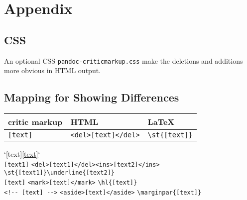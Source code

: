 \documentclass[]{article}
\begin{document}
\section{Appendix}\label{appendix}

\subsection{CSS}\label{css}

An optional CSS \texttt{pandoc-criticmarkup.css} make the deletions and
additions more obvious in HTML output.

\subsection{Mapping for Showing
Differences}\label{mapping-for-showing-differences}

\begin{longtable}[]{@{}lll@{}}
\toprule
critic markup & HTML & LaTeX\tabularnewline
\midrule
\endhead
\texttt{{[}text{]}} &
\texttt{\textless{}del\textgreater{}{[}text{]}\textless{}/del\textgreater{}}
& \texttt{\textbackslash{}st\{{[}text{]}\}}\tabularnewline
\bottomrule
\end{longtable}

`\texttt{\textbar{}}{[}text{]}\texttt{\textbar{}}\underline{[text]}`
\textbar{}\\
\texttt{{[}text1{]}} \textbar{}
\texttt{\textless{}del\textgreater{}{[}text1{]}\textless{}/del\textgreater{}\textless{}ins\textgreater{}{[}text2{]}\textless{}/ins\textgreater{}}
\textbar{}
\texttt{\textbackslash{}st\{{[}text1{]}\}\textbackslash{}underline\{{[}text2{]}\}}
\textbar{}\\
\texttt{{[}text{]}} \textbar{}
\texttt{\textless{}mark\textgreater{}{[}text{]}\textless{}/mark\textgreater{}}
\textbar{} \texttt{\textbackslash{}hl\{{[}text{]}\}} \textbar{}\\
\texttt{\textless{}!-\/-\ {[}text{]}\ -\/-\textgreater{}} \textbar{}
\texttt{\textless{}aside\textgreater{}{[}text{]}\textless{}/aside\textgreater{}}
\textbar{} \texttt{\textbackslash{}marginpar\{{[}text{]}\}} \textbar{}
\end{document}
